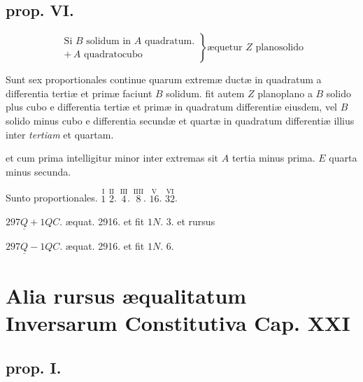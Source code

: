 \documentclass[11pt,a4paper]{article}
\begin{document}
\subsection*{prop. VI.}

\[ \left. \begin{array}{l} \text{Si } B \text{ solidum in } A \text{ quadratum.} \\ +\,A \text{ quadratocubo} \end{array} \right\} \text{æquetur } Z \text{ planosolido} \]

Sunt sex proportionales continue quarum extremæ ductæ in quadratum a differentia tertiæ et primæ faciunt $B$ solidum. fit autem $Z$ planoplano a $B$ solido plus cubo e differentia tertiæ et primæ in quadratum differentiæ eiusdem, vel $B$ solido minus cubo e differentia secundæ et quartæ in quadratum differentiæ illius inter \emph{tertiam} et quartam.

et cum prima intelligitur minor inter extremas sit $A$ tertia minus prima. $E$ quarta minus secunda.

Sunto proportionales. $\overset{\text{I}}{1}$ $\overset{\text{II}}{2}$. $\overset{\text{III}}{4}$. $\overset{\text{IIII}}{8}$. $\overset{\text{V}}{16}$. $\overset{\text{VI}}{32}$.

$297\underline{Q} + 1QC$. æquat. 2916. et fit $1N$. 3. et rursus

$297\underline{Q} - 1QC$. æquat. 2916. et fit $1N$. 6.


\section*{Alia rursus æqualitatum Inversarum Constitutiva Cap. XXI}

\subsection*{prop. I.}
\end{document}
